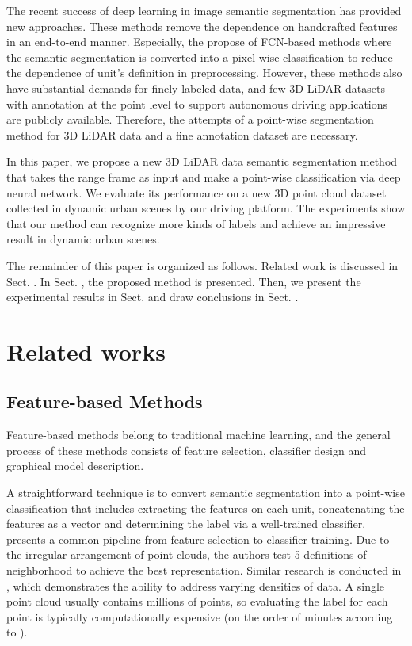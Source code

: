 	The recent success of deep learning in image semantic segmentation has provided new approaches\cite{garcia2017review}. These methods remove the dependence on handcrafted features in an end-to-end manner. Especially, the propose of FCN-based methods\cite{long2015fully} where the semantic segmentation is converted into a pixel-wise classification to reduce the dependence of unit's definition in preprocessing. However, these methods also have substantial demands for finely labeled data\cite{garcia2017review}, and few 3D LiDAR datasets with annotation at the point level to support autonomous driving applications are publicly available. Therefore, the attempts of a point-wise segmentation method for 3D LiDAR data and a fine annotation dataset are necessary.
	
	In this paper, we propose a new 3D LiDAR data semantic segmentation method that takes the range frame as input and make a point-wise classification via deep neural network. We evaluate its performance on a new 3D point cloud dataset collected in dynamic urban scenes by our driving platform. The experiments show that our method can recognize more kinds of labels and achieve an impressive result in dynamic urban scenes.
	
	The remainder of this paper is organized as follows. Related work is discussed in Sect. \uppercase\expandafter{}. In Sect. \uppercase\expandafter{}, the proposed method is presented. Then, we present the experimental results in Sect. \uppercase\expandafter{} and draw conclusions in Sect. \uppercase\expandafter{}.
	

\section{Related works}
	\subsection{Feature-based Methods}
	Feature-based methods belong to traditional machine learning, and the general process of these methods consists of feature selection, classifier design and graphical model description.
	
	A straightforward technique is to convert semantic segmentation into a point-wise classification that includes extracting the features on each unit, concatenating the features as a vector and determining the label via a well-trained classifier. \cite{weinmann2014semantic} presents a common pipeline from feature selection to classifier training. Due to the irregular arrangement of point clouds, the authors test 5 definitions of neighborhood to achieve the best representation. Similar research is conducted in \cite{hackel2016fast}, which demonstrates the ability to address varying densities of data. A single point cloud usually contains millions of points, so evaluating the label for each point is typically computationally expensive (on the order of minutes according to \cite{hackel2016fast}). 
	
